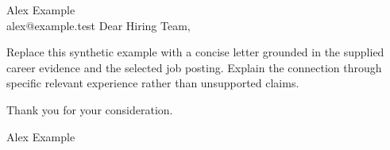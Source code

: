 \documentclass[11pt,a4paper]{article}
\begin{document}
{\large Alex Example}\\
alex@example.test
\bigskip
Dear Hiring Team,

Replace this synthetic example with a concise letter grounded in the supplied
career evidence and the selected job posting. Explain the connection through
specific relevant experience rather than unsupported claims.

Thank you for your consideration.

Alex Example
\end{document}
